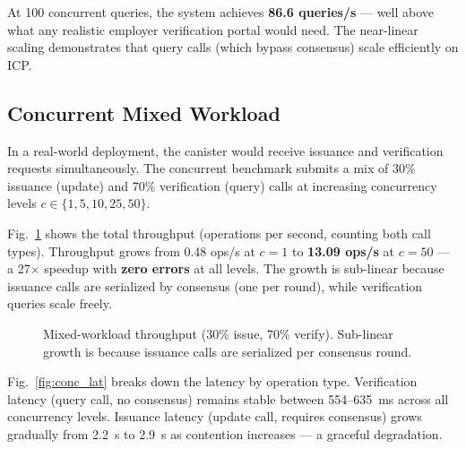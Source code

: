 \documentclass[journal]{IEEEtran}
\begin{document}
At 100 concurrent queries, the system achieves \textbf{86.6 queries/s} — well above what any realistic employer verification portal would need. The near-linear scaling demonstrates that query calls (which bypass consensus) scale efficiently on ICP.

\subsection{Concurrent Mixed Workload}

In a real-world deployment, the canister would receive issuance and verification requests simultaneously. The concurrent benchmark submits a mix of 30\% issuance (update) and 70\% verification (query) calls at increasing concurrency levels $c \in \{1, 5, 10, 25, 50\}$.

Fig.~\ref{fig:conc_tput} shows the total throughput (operations per second, counting both call types). Throughput grows from 0.48 ops/s at $c = 1$ to \textbf{13.09 ops/s} at $c = 50$ — a 27$\times$ speedup with \textbf{zero errors} at all levels. The growth is sub-linear because issuance calls are serialized by consensus (one per round), while verification queries scale freely.

\begin{figure}[t]
\centering
{}
\caption{Mixed-workload throughput (30\% issue, 70\% verify). Sub-linear growth is because issuance calls are serialized per consensus round.}
\label{fig:conc_tput}
\end{figure}

Fig.~\ref{fig:conc_lat} breaks down the latency by operation type. Verification latency (query call, no consensus) remains stable between 554--635~ms across all concurrency levels. Issuance latency (update call, requires consensus) grows gradually from 2.2~s to 2.9~s as contention increases — a graceful degradation.
\end{document}
